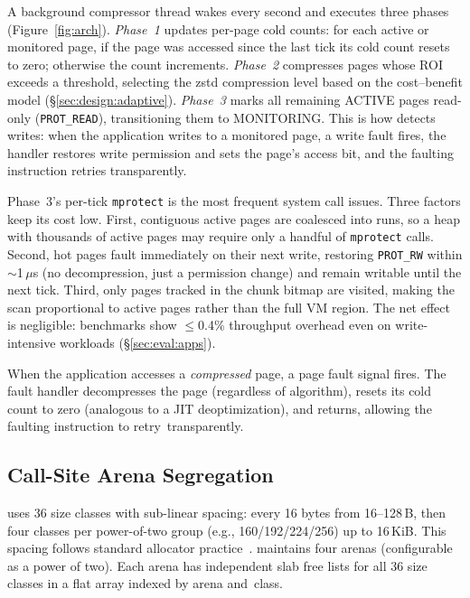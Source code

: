 A background compressor thread wakes every second and executes three
phases (Figure~\ref{fig:arch}).  \emph{Phase~1} updates per-page
cold counts: for each active or monitored page, if the page was
accessed since the last tick its cold count resets to zero; otherwise
the count increments.  \emph{Phase~2} compresses pages whose ROI exceeds a
threshold, selecting the zstd compression level based on the cost--benefit
model (\S\ref{sec:design:adaptive}).  \emph{Phase~3}
marks all remaining ACTIVE pages read-only (\texttt{PROT\_READ}),
transitioning them to MONITORING.  This is how \sys detects writes:
when the application writes to a monitored page, a write fault fires,
the handler restores write permission and sets the page's access bit,
and the faulting instruction retries transparently.

Phase~3's per-tick \texttt{mprotect} is the most
frequent system call \sys issues.  Three factors keep its cost low.
First, contiguous active pages are coalesced into runs, so a heap
with thousands of active pages may require only a handful of
\texttt{mprotect} calls.  Second, hot pages fault immediately on
their next write, restoring \texttt{PROT\_RW} within
$\sim$1\,$\mu$s (no decompression, just a permission change) and
remain writable until the next tick.  Third, only pages tracked in
the chunk bitmap are visited, making the scan proportional to active
pages rather than the full VM region.  The net effect is negligible:
benchmarks show $\leq$0.4\% throughput overhead even on
write-intensive workloads (\S\ref{sec:eval:apps}).

When the application accesses a \emph{compressed} page, a page
fault signal fires.  The fault handler decompresses the page
(regardless of algorithm), resets its cold count to zero
(analogous to a JIT deoptimization), and returns, allowing the
faulting instruction to retry~transparently.

\subsection{Call-Site Arena Segregation}
\label{sec:design:arenas}

\sys uses 36 size classes with sub-linear spacing: every 16
bytes from 16--128\,B, then four classes per power-of-two group
(e.g., 160/192/224/256) up to 16\,KiB.  This spacing follows standard
allocator practice~\cite{berger2001composing}.  \sys maintains
four arenas (configurable as a power of two).  Each arena has
independent slab free lists for all 36 size classes in a flat
array indexed by arena and~class.


